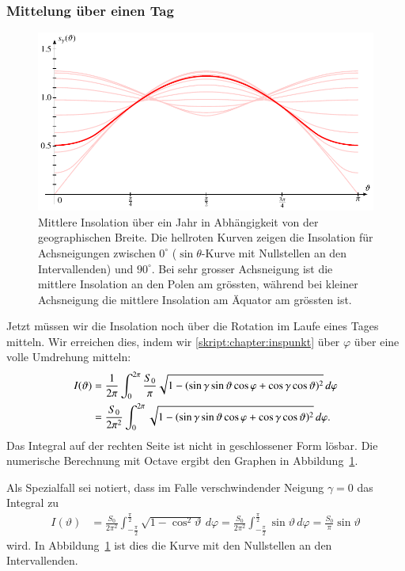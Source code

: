 \subsubsection{Mittelung über einen Tag}
\begin{figure}
\centering
\includegraphics{chapters/5/ell2.pdf}
\caption{Mittlere Insolation über ein Jahr in Abhängigkeit von der
geographischen Breite.
Die hellroten Kurven zeigen die Insolation für Achsneigungen zwischen
$0^\circ$ ($\sin\theta$-Kurve mit Nullstellen an den Intervallenden)
und $90^\circ$.
Bei sehr grosser Achsneigung ist die mittlere Insolation an den Polen
am grössten, während bei kleiner Achsneigung die mittlere Insolation
am Äquator am grössten ist.
\label{skript:einstrahlung:jahrinsbild}}
\end{figure}
Jetzt müssen wir die Insolation noch über die Rotation im Laufe eines 
Tages mitteln.
Wir erreichen dies, indem wir \eqref{skript:chapter:inspunkt}
über $\varphi$ über eine volle Umdrehung mitteln:
\begin{align}
I(\vartheta)
&=
\frac{1}{2\pi}
\int_0^{2\pi}
\frac{S_0}{\pi}
\sqrt{1-
(\sin\gamma\sin\vartheta\cos\varphi+\cos\gamma\cos\vartheta)^2}
\,d\varphi
\notag
\\
&=
\frac{S_0}{2\pi^2}
\int_0^{2\pi}
\sqrt{1-
(\sin\gamma\sin\vartheta\cos\varphi+\cos\gamma\cos\vartheta)^2}
\,d\varphi.
\label{skript:einstrahlung:mittlereinsolation}
\end{align}
Das Integral auf der rechten Seite ist nicht in geschlossener
Form lösbar.
Die numerische Berechnung mit Octave ergibt den Graphen
in Abbildung~\ref{skript:einstrahlung:jahrinsbild}.

Als Spezialfall sei notiert, dass im Falle verschwindender Neigung
$\gamma=0$ das Integral zu
\begin{align*}
I(\vartheta)
&=
\frac{S_0}{2\pi^2}
\int_{-\frac{\pi}2}^{\frac{\pi}2}
\sqrt{1-\cos^2\vartheta}
\,d\varphi
=
\frac{S_0}{2\pi^2}
\int_{-\frac{\pi}2}^{\frac{\pi}2}
\sin\vartheta
\,d\varphi
=
\frac{S_0}{\pi}
\sin\vartheta
\end{align*}
wird.
In Abbildung~\ref{skript:einstrahlung:jahrinsbild} ist dies die
Kurve mit den Nullstellen an den Intervallenden.

